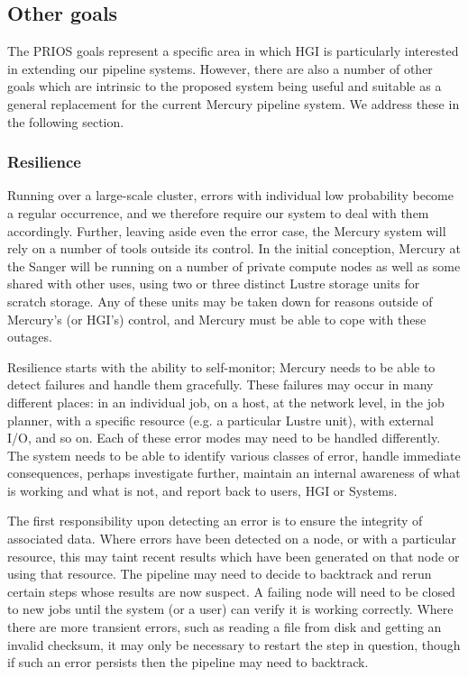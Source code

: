 \documentclass[10pt,a4paper]{article}
\newcommand{\npar}{\par\noindent\space}
\begin{document}
\subsection{Other goals}
\npar The PRIOS goals represent a specific area in which HGI is particularly interested in extending our pipeline systems. However, there are also a number of other goals which are intrinsic to the proposed system being useful and suitable as a general replacement for the current Mercury pipeline system. We address these in the following section.

\subsubsection{Resilience}
\label{sec:resilience}
\npar Running over a large-scale cluster, errors with individual low probability become a regular occurrence, and we therefore require our system to deal with them accordingly. Further, leaving aside even the error case, the Mercury system will rely on a number of tools outside its control. In the initial conception, Mercury at the Sanger will be running on a number of private compute nodes as well as some shared with other uses, using two or three distinct Lustre storage units for scratch storage. Any of these units may be taken down for reasons outside of Mercury's (or HGI's) control, and Mercury must be able to cope with these outages.
\npar Resilience starts with the ability to self-monitor; Mercury needs to be able to detect failures and handle them gracefully. These failures may occur in many different places: in an individual job, on a host, at the network level, in the job planner, with a specific resource (e.g. a particular Lustre unit), with external I/O, and so on. Each of these error modes may need to be handled differently. The system needs to be able to identify various classes of error, handle immediate consequences, perhaps investigate further, maintain an internal awareness of what is working and what is not, and report back to users, HGI or Systems.
\npar The first responsibility upon detecting an error is to ensure the integrity of associated data. Where errors have been detected on a node, or with a particular resource, this may taint recent results which have been generated on that node or using that resource. The pipeline may need to decide to backtrack and rerun certain steps whose results are now suspect. A failing node will need to be closed to new jobs until the system (or a user) can verify it is working correctly. Where there are more transient errors, such as reading a file from disk and getting an invalid checksum, it may only be necessary to restart the step in question, though if such an error persists then the pipeline may need to backtrack.
\end{document}
